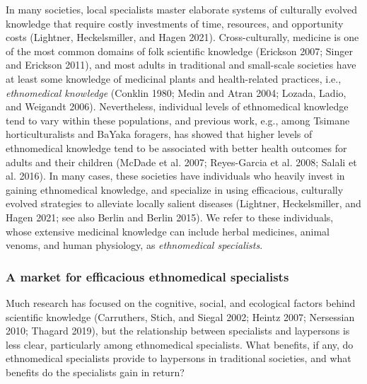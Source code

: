 \documentclass[
  11pt,
]{article}
\begin{document}
In many societies, local specialists master elaborate systems of culturally evolved knowledge that require costly investments of time, resources, and opportunity costs (Lightner, Heckelsmiller, and Hagen 2021). Cross-culturally, medicine is one of the most common domains of folk scientific knowledge (Erickson 2007; Singer and Erickson 2011), and most adults in traditional and small-scale societies have at least some knowledge of medicinal plants and health-related practices, i.e., \emph{ethnomedical knowledge} (Conklin 1980; Medin and Atran 2004; Lozada, Ladio, and Weigandt 2006). Nevertheless, individual levels of ethnomedical knowledge tend to vary within these populations, and previous work, e.g., among Tsimane horticulturalists and BaYaka foragers, has showed that higher levels of ethnomedical knowledge tend to be associated with better health outcomes for adults and their children (McDade et al. 2007; Reyes-Garcia et al. 2008; Salali et al. 2016). In many cases, these societies have individuals who heavily invest in gaining ethnomedical knowledge, and specialize in using efficacious, culturally evolved strategies to alleviate locally salient diseases (Lightner, Heckelsmiller, and Hagen 2021; see also Berlin and Berlin 2015). We refer to these individuals, whose extensive medicinal knowledge can include herbal medicines, animal venoms, and human physiology, as \emph{ethnomedical specialists}.

\hypertarget{a-market-for-efficacious-ethnomedical-specialists}{%
\subsubsection{A market for efficacious ethnomedical specialists}\label{a-market-for-efficacious-ethnomedical-specialists}}

Much research has focused on the cognitive, social, and ecological factors behind scientific knowledge (Carruthers, Stich, and Siegal 2002; Heintz 2007; Nersessian 2010; Thagard 2019), but the relationship between specialists and laypersons is less clear, particularly among ethnomedical specialists. What benefits, if any, do ethnomedical specialists provide to laypersons in traditional societies, and what benefits do the specialists gain in return?
\end{document}

